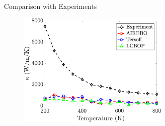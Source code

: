 \documentclass[handout,xcolor={x11names,table},compress,svgnames,mathserif]{beamer}
\renewcommand{\(}{\begin{columns}}
\renewcommand{\)}{\end{columns}}
\newcommand{\<}[1]{\begin{column}{#1}}
\renewcommand{\>}{\end{column}}
\begin{document}
\begin{frame}{Comparison with Experiments}

\begin{figure}[htbp]
\begin{center}
\includegraphics[width=0.65\textwidth]{./Figures/comp_k}
\end{center}
\end{figure}

\end{frame}

\end{document}

